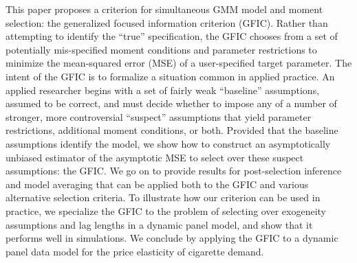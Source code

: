 This paper proposes a criterion for simultaneous GMM model and moment selection: the generalized focused information criterion (GFIC). 
Rather than attempting to identify the ``true'' specification, the GFIC chooses from a set of potentially mis-specified moment conditions and parameter restrictions to minimize the mean-squared error (MSE) of a user-specified target parameter.
The intent of the GFIC is to formalize a situation common in applied practice.
An applied researcher begins with a set of fairly weak ``baseline'' assumptions, assumed to be correct, and must decide whether to impose any of a number of stronger, more controversial ``suspect'' assumptions that yield parameter restrictions, additional moment conditions, or both.
Provided that the baseline assumptions identify the model, we show how to construct an asymptotically unbiased estimator of the asymptotic MSE to select over these suspect assumptions: the GFIC. 
We go on to provide results for post-selection inference and model averaging that can be applied both to the GFIC and various alternative selection criteria.
To illustrate how our criterion can be used in practice, we specialize the GFIC to the problem of selecting over exogeneity assumptions and lag lengths in a dynamic panel model, and show that it performs well in simulations.
We conclude by applying the GFIC to a dynamic panel data model for the price elasticity of cigarette demand. 

